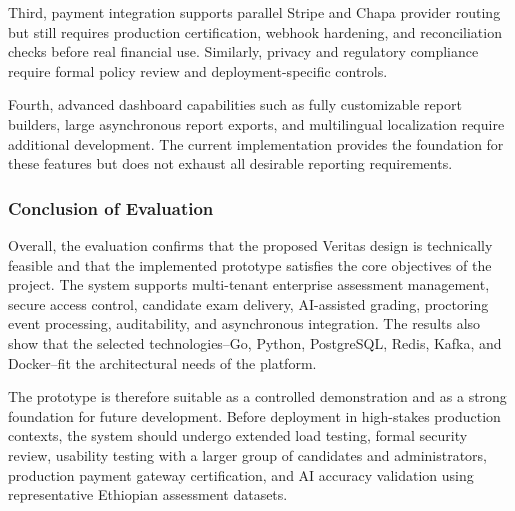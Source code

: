 Third, payment integration supports parallel Stripe and Chapa provider routing but still requires production certification, webhook hardening, and reconciliation checks before real financial use. Similarly, privacy and regulatory compliance require formal policy review and deployment-specific controls.

Fourth, advanced dashboard capabilities such as fully customizable report builders, large asynchronous report exports, and multilingual localization require additional development. The current implementation provides the foundation for these features but does not exhaust all desirable reporting requirements.

\subsubsection{Conclusion of Evaluation}
Overall, the evaluation confirms that the proposed Veritas design is technically feasible and that the implemented prototype satisfies the core objectives of the project. The system supports multi-tenant enterprise assessment management, secure access control, candidate exam delivery, AI-assisted grading, proctoring event processing, auditability, and asynchronous integration. The results also show that the selected technologies--Go, Python, PostgreSQL, Redis, Kafka, and Docker--fit the architectural needs of the platform.

The prototype is therefore suitable as a controlled demonstration and as a strong foundation for future development. Before deployment in high-stakes production contexts, the system should undergo extended load testing, formal security review, usability testing with a larger group of candidates and administrators, production payment gateway certification, and AI accuracy validation using representative Ethiopian assessment datasets.

